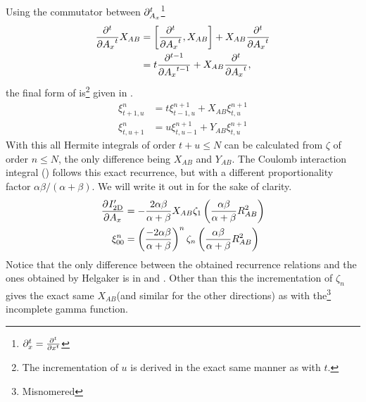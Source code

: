     Using the commutator between
    $\mathrm{\partial}^t_{A_x}$\footnote{$\prtl^t_x=\prd{x}[][t]$}
        \begin{align}
            \prd{A_x}[][t] X_{AB} &= \left[\prd{A_x}[][t], X_{AB}\right] +
            X_{AB}\prd{A_x}[][t] \nonumber \\
            &= t\prd{A_x}[][t-1] + X_{AB}\prd{A_x}[][t],
        \end{align}
    the final form of  is\footnote{The incrementation of $u$ is
    derived in the exact same manner as with $t$.} given in
    .
        \begin{equation}
            \begin{aligned}
                \xi^n_{t+1,u} &= t\xi^{n+1}_{t-1,u} + X_{AB}\xi^{n+1}_{t,u} \\
                \xi^n_{t,u+1} &= u\xi^{n+1}_{t,u-1} + Y_{AB}\xi^{n+1}_{t,u}
            \end{aligned}
            \label{eq:incfinalfinal}
        \end{equation}
    With this all Hermite integrals of order $t+u\leq N$ can be calculated from
    $\zeta$ of order $n\leq N$, the only difference being $X_{AB}$ and
    $Y_{AB}$. The Coulomb interaction integral
    () follows this exact recurrence, but
    with a different proportionality factor $\alpha\beta/(\alpha+\beta)$. We
    will write it out in  for the sake of clarity.
        \begin{equation}
            \begin{aligned}
                \prd{A_x}[I'_{\text{2D}}] &= -\frac{2\alpha\beta}{\alpha+\beta}
                X_{AB}\zeta_1\left(\frac{\alpha\beta}{\alpha+\beta}R^2_{AB}\right)
                \\
                \xi^n_{00} &= \left(\frac{-2\alpha\beta}{\alpha+\beta}\right)^n
                \zeta_n\left(\frac{\alpha\beta}{\alpha+\beta} R^2_{AB}\right)
            \end{aligned}
            \label{eq:recurrInteraction}
        \end{equation}
    Notice that the only difference between the obtained recurrence relations
    and the ones obtained by Helgaker\cite{HelgakerGauss} is in
     and . Other than this the
    incrementation of $\zeta_n$ gives the exact same $X_{AB}$(and similar for
    the other directions) as with the\footnote{Misnomered} incomplete gamma
    function.

